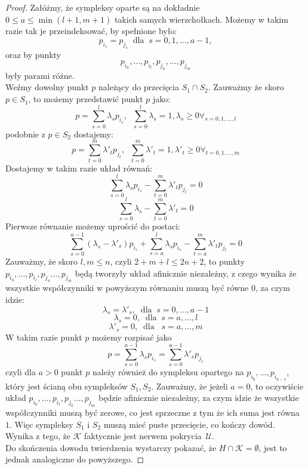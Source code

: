 \begin{proof}
    Załóżmy, że sympleksy oparte są na dokładnie $0\le a\le \min(l+1, m+1)$ takich samych wierzchołkach. Możemy w takim razie tak je przeindeksować, by spełnione było:
    \[p_{i_s}=p_{j_s} \;\; \mathrm{dla} \;\;s=0,1,\ldots, a-1,\]
    oraz by punkty
    \[p_{i_a}, \ldots, p_{i_l}, p_{j_a},\ldots,  p_{j_m}\]
    były parami różne.\\
    Weźmy dowolny punkt $p$ należący do przecięcia $S_1\cap S_2$. Zauważmy że skoro $p\in S_1$, to możemy przedstawić punkt $p$ jako:
    \[p=\sum _{s=0}^l \lambda_sp_{i_s}, \;\; \sum_{s=0}^l\lambda_s=1,
    \lambda_s\ge 0\forall_{s=0,1, \ldots, l} \]
    podobnie z $p\in S_2$ dostajemy:
    \[p=\sum _{t=0}^m \lambda'_tp_{j_t}, \;\; \sum_{t=0}^m\lambda'_t=1,
    \lambda'_t\ge 0\forall_{t=0,1, \ldots, m} \]
    Dostajemy w takim razie układ równań:
    \[\sum _{s=0}^l \lambda_sp_{i_s}- \sum _{t=0}^m \lambda'_tp_{j_t} = 
    0\]
    \[\sum _{s=0}^l \lambda_s - \sum _{t=0}^m \lambda'_t = 0\]
    Pierwsze równanie możemy uprościć do postaci:
    \[
    \sum _{s=0}^{a-1} (\lambda_s-\lambda'_s)p_{i_s} +
    \sum _{s=a}^l \lambda_sp_{i_s}- \sum _{t=a}^m \lambda'_tp_{j_t} = 
    0\]
    Zauważmy, że skoro $l, m\le n$, czyli $2+m+l\le 2n+2$, to punkty 
    $p_{i_0}, \ldots, p_{i_l},p_{j_a}\ldots ,p_{j_m}$ będą tworzyły układ afinicznie niezależny, z czego wynika że wszystkie współczynniki w powyższym równaniu muszą być równe 0, za czym idzie:
    \[\lambda_s=\lambda'_s,  \;\;\mathrm{dla}\;\;s=0,\ldots, a-1 \]
    \[\lambda_s = 0, \;\;\mathrm{dla}\;\;s=a, \ldots,l\]
    \[\lambda'_s=0,  \;\;\mathrm{dla}\;\;\;s=a,\ldots, m\]
    W takim razie punkt $p$ możemy rozpisać jako
    \[p=\sum_{s=0}^{a-1}\lambda_sp_{i_s}=\sum_{s=0}^{a-1}\lambda'_sp_{j_s}\]
    czyli dla $a>0$ punkt $p$ należy również do sympleksu opartego na $p_{i_0}, \ldots, p_{i_{a-1}}$, który jest ścianą obu sympleksów $S_1, S_2$. Zauważmy, że jeżeli $a=0$, to oczywiście układ $p_{i_0}, \ldots, p_{i_l},p_{j_0}\ldots ,p_{j_m}$ będzie afinicznie niezależny, za czym idzie że wszystkie współczynniki muszą być zerowe, co jest sprzeczne z tym że ich suma jest równa $1$. Więc sympleksy $S_1$ i $S_2$ muszą mieć puste przecięcie, co kończy dowód.\\
    Wynika z tego, że $\mathcal{K}$ faktycznie jest nerwem pokrycia~$\mathcal{U}$.\\
    Do skończenia dowodu twierdzenia wystarczy pokazać, że $H\cap \mathcal{K}=\emptyset$, jest to jednak analogiczne do powyższego.
\end{proof}